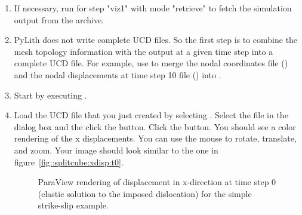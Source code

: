 \begin{enumerate}
\item If necessary, run  for step "viz1" with mode
  "retrieve" to fetch the simulation output from the archive.

  \begin{screen}
    \shellprompt{}
  \end{screen}
  
\item PyLith does not write complete UCD files. So the first step is
  to combine the mesh topology information with the output at a given
  time step into a complete UCD file. For example, use 
  to merge the nodal coordinates file
  () and the nodal displacements at
  time step 10 file () into
  .

  \begin{screen}
    \shellprompt{}
\end{screen}

\item Start  by executing .

  \begin{screen}
    \shellprompt{}
  \end{screen}
  
\item Load the UCD file that you just created by selecting
  \guiselect{}. Select the file in
  the dialog box and the click the  button. Click the
   button. You should see a color rendering of the x
  displacements. You can use the mouse to rotate, translate, and zoom.
  Your image should look similar to the one in
  figure~\ref{fig::splitcube:xdisp:t0}.
        
  \begin{figure}[htbp]
    \begin{center}
      \caption{ParaView rendering of displacement in x-direction at
        time step 0 (elastic solution to the imposed dislocation) for
        the simple strike-slip example.}
      \label{fig:splitcube:xdisp:00}
    \end{center}
  \end{figure}
  

\end{enumerate}

